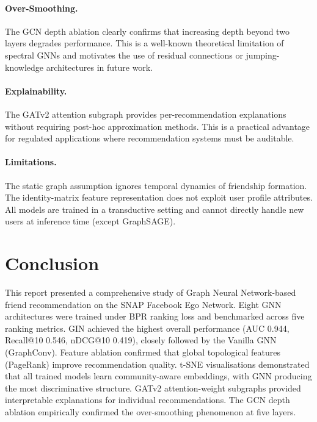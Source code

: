 \documentclass[12pt,a4paper]{article}
\begin{document}
\paragraph{Over-Smoothing.} The GCN depth ablation clearly confirms that increasing depth beyond two layers degrades performance. This is a well-known theoretical limitation of spectral GNNs and motivates the use of residual connections or jumping-knowledge architectures in future work.

\paragraph{Explainability.} The GATv2 attention subgraph provides per-recommendation explanations without requiring post-hoc approximation methods. This is a practical advantage for regulated applications where recommendation systems must be auditable.

\paragraph{Limitations.} The static graph assumption ignores temporal dynamics of friendship formation. The identity-matrix feature representation does not exploit user profile attributes. All models are trained in a transductive setting and cannot directly handle new users at inference time (except GraphSAGE).

\section{Conclusion}
\label{sec:conclusion}

This report presented a comprehensive study of Graph Neural Network-based friend recommendation on the SNAP Facebook Ego Network. Eight GNN architectures were trained under BPR ranking loss and benchmarked across five ranking metrics. GIN achieved the highest overall performance (AUC 0.944, Recall@10 0.546, nDCG@10 0.419), closely followed by the Vanilla GNN (GraphConv). Feature ablation confirmed that global topological features (PageRank) improve recommendation quality. t-SNE visualisations demonstrated that all trained models learn community-aware embeddings, with GNN producing the most discriminative structure. GATv2 attention-weight subgraphs provided interpretable explanations for individual recommendations. The GCN depth ablation empirically confirmed the over-smoothing phenomenon at five layers.
\end{document}
